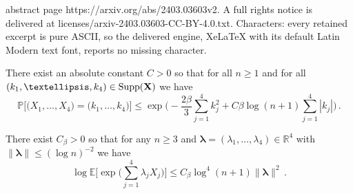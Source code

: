 \documentclass[10pt,a4paper]{amsart}
\def\la{{\lambda}}
\newcommand{\bE}{\mathbb E}
\newcommand{\bP}{\mathbb P}
\newcommand{\bR}{\mathbb R}
\begin{document}
abstract page https://arxiv.org/abs/2403.03603v2. A full rights notice is delivered at licenses/arxiv-2403.03603-CC-BY-4.0.txt. Characters: every retained excerpt is pure ASCII, so the delivered engine, XeLaTeX with its default Latin Modern text font, reports no missing character.
	\begin{lemma}
		\label{lemma:tail_probability_for_disc_at_top_level}
		There exist an absolute constant $C>0$ so that for all $n\ge 1$ and for all $(k_1,\ldots,k_4)\in\text{\normalfont Supp}({\bf X})$ we have
		\begin{equation*}
			\bP\Big[\big(X_1,\ldots,X_4\big) = \big(k_1,\ldots,k_4\big)\Big] \le \exp\Big(-\frac{2\beta}{3}\sum_{j=1}^{4} k_j^2 + C\beta \log(n+1) \sum_{j=1}^4 |k_j|\Big)\, .
		\end{equation*}
	\end{lemma}

	\begin{lemma}
		\label{lemma:upper_bound_on_MGF_top_level_small_input}
		There exist $C_\beta>0$ so that for any $n\ge 3$ and $\boldsymbol{\la} = (\la_1,\ldots,\la_4)\in \bR^4$ with  \(
		\|\boldsymbol{\la}\|\le (\log n)^{-2}\) we have
		\begin{equation*}
			\log\bE\bigg[\exp\Big(\sum_{j=1}^{4} \la_j X_j\Big)\bigg] \le  C_\beta \log^4(n+1)\|\boldsymbol{\la} \|^2 \, .
		\end{equation*} 
	\end{lemma}
\end{document}
